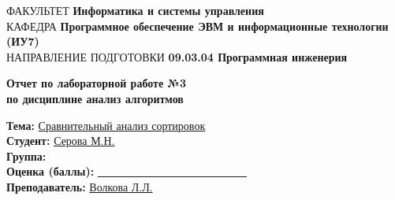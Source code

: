 \begin{titlepage}
	{\doublespacing \small \raggedright ФАКУЛЬТЕТ \hspace{2mm} \textbf{Информатика и системы управления}\\
		КАФЕДРА \hspace{2mm} \textbf{Программное обеспечение ЭВМ и информационные технологии (ИУ7)}\\
		НАПРАВЛЕНИЕ ПОДГОТОВКИ \hspace{2mm} \textbf{09.03.04 Программная инженерия}\\}
	
	
	\vspace{30mm}
	
	\begin{center}
			\centering
			\Large\textbf{  Отчет по лабораторной работе №3}\\
			\textbf{по дисциплине анализ алгоритмов}\\
	\end{center}
	\vspace{20mm}

	
	{\doublespacing\raggedright
		\textbf{Тема:} \hspace{27mm}\underline{Сравнительный анализ сортировок}\\
		\textbf{Студент:} \hspace{17mm} \underline{Серова М.Н.}\\
		\textbf{Группа:} \hspace{21mm}\underline{}\\
		\textbf{Оценка (баллы):} \underline{~~~~~~~~~~~~~~~~~~~~~~~~~~~}\\
	\textbf{Преподаватель:} \hspace{2mm}\underline{Волкова Л.Л.}\\}
	


\end{titlepage}
